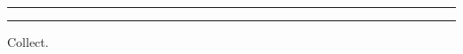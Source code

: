 
{\gresetfirstlineaboveinitial{\annot}{\annot}
\setsecondannotation{\annottwo}


\large
{}}%
\translation[]{\englishcommagantiphon}
\bigskip
\hrule
\bigskip\bigskip
{\large\greblockcustos{}}
\vspace{0pt minus 36pt}
%
\bigskip
\hrule
\bigskip
\begin{center}{\large Collect.}\end{center}
\begin{parcolumns}[rulebetween]{2}
\sloppy
\prayer{\latincomcollect}{\englishcomcollect}
\end{parcolumns}
%
